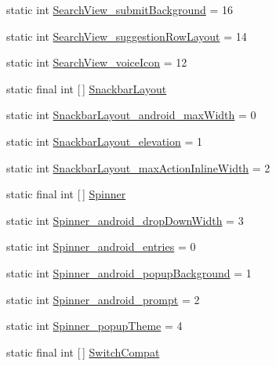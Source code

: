 \begin{DoxyCompactItemize}
\item 
static int \hyperlink{classandroid_1_1support_1_1v4_1_1R_1_1styleable_ad5c34c512b8b52cc4e15a14f900ed036}{Search\+View\+\_\+submit\+Background} = 16
\item 
static int \hyperlink{classandroid_1_1support_1_1v4_1_1R_1_1styleable_a8f88c91f413bd187e3c108b18f21cd8c}{Search\+View\+\_\+suggestion\+Row\+Layout} = 14
\item 
static int \hyperlink{classandroid_1_1support_1_1v4_1_1R_1_1styleable_af3c725a4fd59183d49fcefdca539db7a}{Search\+View\+\_\+voice\+Icon} = 12
\item 
static final int \mbox{[}$\,$\mbox{]} \hyperlink{classandroid_1_1support_1_1v4_1_1R_1_1styleable_adeacc34656ceb21bac2e2f80c4437fbc}{Snackbar\+Layout}
\item 
static int \hyperlink{classandroid_1_1support_1_1v4_1_1R_1_1styleable_abe4e77c7120a352ab90118f7d7aaab2f}{Snackbar\+Layout\+\_\+android\+\_\+max\+Width} = 0
\item 
static int \hyperlink{classandroid_1_1support_1_1v4_1_1R_1_1styleable_a6de1ff1662bd8a8c27b3cbf7f2e42cd1}{Snackbar\+Layout\+\_\+elevation} = 1
\item 
static int \hyperlink{classandroid_1_1support_1_1v4_1_1R_1_1styleable_aeb129833e9a42db9f72110a798421a5f}{Snackbar\+Layout\+\_\+max\+Action\+Inline\+Width} = 2
\item 
static final int \mbox{[}$\,$\mbox{]} \hyperlink{classandroid_1_1support_1_1v4_1_1R_1_1styleable_a34e1edd521133711195b551c5477c69d}{Spinner}
\item 
static int \hyperlink{classandroid_1_1support_1_1v4_1_1R_1_1styleable_aa72851d0a7ac8f88e7ca0609eec8d558}{Spinner\+\_\+android\+\_\+drop\+Down\+Width} = 3
\item 
static int \hyperlink{classandroid_1_1support_1_1v4_1_1R_1_1styleable_a19ec0a416c4257798426ba10a934a6f7}{Spinner\+\_\+android\+\_\+entries} = 0
\item 
static int \hyperlink{classandroid_1_1support_1_1v4_1_1R_1_1styleable_ab961b75d708bd81e22cb4bb95449e536}{Spinner\+\_\+android\+\_\+popup\+Background} = 1
\item 
static int \hyperlink{classandroid_1_1support_1_1v4_1_1R_1_1styleable_a509106a0db8c7a05859fb9c2c80450da}{Spinner\+\_\+android\+\_\+prompt} = 2
\item 
static int \hyperlink{classandroid_1_1support_1_1v4_1_1R_1_1styleable_a675a1650fe62d85b9e1c1f38de977d94}{Spinner\+\_\+popup\+Theme} = 4
\item 
static final int \mbox{[}$\,$\mbox{]} \hyperlink{classandroid_1_1support_1_1v4_1_1R_1_1styleable_a3b46a9ea84acdcc1d9e88a54fc6f685e}{Switch\+Compat}

\end{DoxyCompactItemize}
